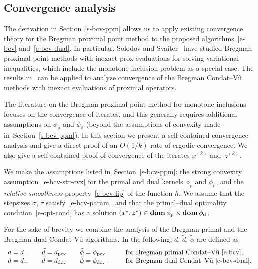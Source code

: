 \documentclass[letterpaper,11pt]{article}
\newcommand{\dom}{\mathop{\bf dom}}
\newcommand{\primal}{\mathrm p}
\newcommand{\dual}{\mathrm d}
\begin{document}
\subsection{Convergence analysis} \label{s-bcv-conv}

The derivation in Section~\ref{s-bcv-ppm} allows us to apply
existing convergence theory for the Bregman proximal point method
to the proposed algorithms~\eqref{e-bcv} and~\eqref{e-bcv-dual}.
In particular, Solodov and Svaiter~\cite{SS00} have studied
Bregman proximal point methods with inexact prox-evaluations
for solving variational inequalities,
which include the monotone inclusion problem as a special case.
The results in~\cite{SS00} can be applied to analyze convergence
of the Bregman Condat--V\~u methods with inexact evaluations of
proximal operators.

The literature on the Bregman proximal point method
for monotone inclusions~\cite{Eck:93,Gul:94,SS00}
focuses on the convergence of iterates,
and this generally requires additional assumptions on 
$\phi_\primal$ and $\phi_\dual$
(beyond the assumptions of convexity made in~Section~\ref{s-bcv-ppm}).
In this section we present a self-contained convergence analysis
and give a direct proof of an $O(1/k)$ rate of ergodic convergence.
We also give a self-contained proof of convergence of the 
iterates $x^{(k)}$ and~$z^{(k)}$.

We make the assumptions listed in~Section~\ref{s-bcv-ppm}:
the strong convexity assumption~\eqref{e-bcv-str-cvx} for the primal
and dual kernels $\phi_\primal$ and $\phi_\dual$, 
and the \emph{relative smoothness} property~\eqref{e-bcv-lip}
of the function $h$.  We assume that the stepsizes $\sigma$, $\tau$
satisfy~\eqref{e-bcv-param}, and that the primal--dual optimality
condition~\eqref{e-opt-cond} has a solution 
$(x^\star, z^\star) \in \dom \phi_\primal \times \dom \phi_\dual$.

For the sake of brevity we combine the analysis of the Bregman primal 
and the Bregman dual Condat-V\~u algorithms.
In the following, $d$, $\tilde d$, $\tilde \phi$ are defined as
\[
\begin{array}{llll}
d = d_- \quad & \tilde d = d_\mathrm{pcv} \quad
  & \tilde \phi = \phi_\mathrm{pcv} \qquad
  & \mbox{for Bregman primal Condat--V\~u~\eqref{e-bcv},} \\
d = d_+ \quad &\tilde d = d_\mathrm{dcv} \quad
  & \tilde \phi = \phi_\mathrm{dcv} \qquad
  & \mbox{for Bregman dual Condat--V\~u~\eqref{e-bcv-dual}.}
\end{array}
\]
\end{document}
